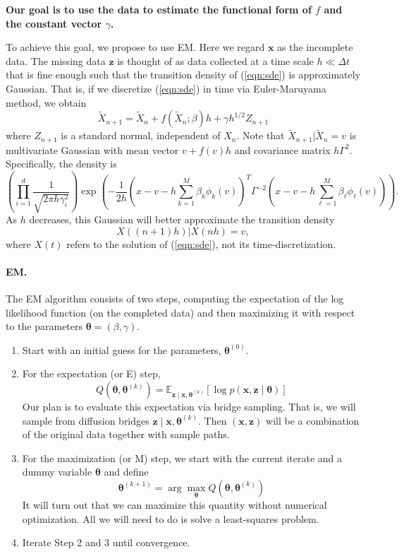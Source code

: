 \documentclass{article}
\newcommand{\btheta}{\ensuremath{\bm{\theta}}}
\newcommand{\bx}{\ensuremath{\mathbf{x}}}
\newcommand{\bz}{\ensuremath{\mathbf{z}}}
\begin{document}
\textbf{Our goal is to use the data to estimate the functional form of $f$ and the constant vector $\gamma$.}

To achieve this goal, we propose to use EM.  Here we regard $\mathbf{x}$ as the incomplete data.  The missing data $\mathbf{z}$ is thought of as data collected at a time scale $h \ll \Delta t$ that is fine enough such that the transition density of (\ref{eqn:sde}) is approximately Gaussian.  That is, if we discretize (\ref{eqn:sde}) in time via Euler-Maruyama method, we obtain
\begin{equation} \label{eqn:euler}
\widetilde{X}_{n+1} = \widetilde{X}_n + f(\widetilde{X}_n; \beta) h + \gamma h^{1/2} Z_{n+1}
\end{equation}
where $Z_{n+1}$ is a standard normal, independent of $X_n$.  Note that $\widetilde{X}_{n+1} | \widetilde{X}_n = v$ is multivariate Gaussian with mean vector $v + f(v) h$ and covariance matrix $h \Gamma^2$.  Specifically, the density is
$$
\left( \prod_{i=1}^d \frac{1}{\sqrt{2 \pi h \gamma_i^2}} \right)
\exp \left( -\frac{1}{2h} (x - v - h \sum_{k=1}^M \beta_k \phi_k(v))^T \Gamma^{-2} (x - v - h \sum_{\ell=1}^M \beta_\ell \phi_\ell(v)) \right).
$$
As $h$ decreases, this Gaussian will better approximate the transition density
$$
X((n+1)h) | X(nh) = v,
$$
where $X(t)$ refers to the solution of (\ref{eqn:sde}), not its time-discretization.

\paragraph{EM.} The EM algorithm consists of two steps, computing the expectation of the log likelihood function (on the completed data) and then maximizing it with respect to the parameters $\btheta = (\beta, \gamma)$.
\begin{enumerate}
\item Start with an initial guess for the parameters, $\btheta^{(0)}$.
\item For the expectation (or E) step,
\begin{equation}
\label{eqn:expectation}
Q(\btheta, \btheta^{(k)}) = \mathbb{E}_{\bz \mid \bx, \btheta^{(k)}} [\log p(\bx, \bz \mid \btheta)]
\end{equation}
Our plan is to evaluate this expectation via bridge sampling.  That is, we will sample from diffusion bridges $\bz \mid \bx, \btheta^{(k)}$.  Then $(\bx, \bz)$ will be a combination of the original data together with sample paths.
\item For the maximization (or M) step, we start with the current iterate and a dummy variable $\btheta$ and define
\begin{equation}
\label{eqn:maximization}
\btheta^{(k+1)} = \arg \max_{\btheta} Q(\btheta, \btheta^{(k)})
\end{equation}
It will turn out that we can maximize this quantity without numerical optimization.  All we will need to do is solve a least-squares problem.
\item Iterate Step 2 and 3 until convergence.
\end{enumerate}
\end{document}
